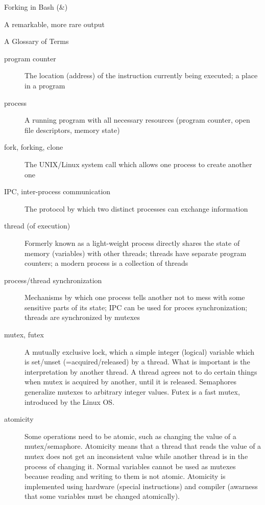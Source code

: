 \documentclass[pdflatex,colorlinks,landscape]{beamer}
\renewcommand\emph[1]{{\color{magenta}#1}}
\begin{document}
\begin{frame}[allowframebreaks]{Forking in Bash (\&)}
  \begin{small}
    
  \end{small}
\end{frame}
\begin{frame}{A remarkable, more rare output}
\end{frame}


\begin{frame}[allowframebreaks]{A Glossary of Terms}
  \begin{description}
  \item[program counter] The location (address) of the instruction currently
    being executed; a place in a program
  \item[process] A running program with all necessary resources
    (program counter, open file descriptors, memory state)
  \item[fork, forking, clone] The UNIX/Linux \emph{system call}
    which allows one process to create another one
  \item[IPC, inter-process communication] The protocol by which
    two distinct processes can exchange information
  \item[thread (of execution)] Formerly known as \emph{a light-weight process}
    directly shares the state of memory (variables) with other
    threads; threads have \emph{separate program counters};
    a modern process is a \emph{collection of threads}
  \item[process/thread synchronization] Mechanisms by which
    one process tells another not to mess with some sensitive
    parts of its state; IPC can be used for proces synchronization;
    threads are synchronized by \emph{mutexes}
  \item[mutex, futex] A mutually exclusive lock, which a simple integer
    (logical) variable which is set/unset (=acquired/released) by a
    thread. What is important is the \emph{interpretation} by another
    thread.  A thread agrees not to do certain things when mutex is
    acquired by another, until it is released. \emph{Semaphores} generalize
    mutexes to arbitrary integer values. \emph{Futex} is a \emph{fast mutex},
    introduced by the Linux OS.
  \item[atomicity] Some operations need to be atomic, such as changing
    the value of a mutex/semaphore. Atomicity means that a thread that
    reads the value of a mutex does not get an inconsistent value
    while another thread is {\color{red} in the process of changing it}.
    Normal variables cannot be used as mutexes because reading
    and writing to them {\color{red}is not atomic}. Atomicity is implemented
    using hardware (special instructions) and compiler (awarness that some
    variables must be changed atomically).
  \end{description}
\end{frame}
\end{document}
